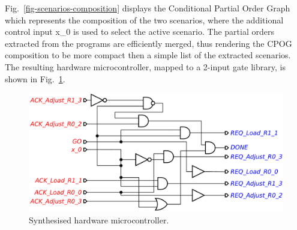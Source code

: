 Fig.~\ref{fig-scenarios-composition} displays the Conditional Partial
Order Graph which represents the composition of the two scenarios, where the
additional control input \textsf{x\_0} is used to select the active scenario.
The partial orders extracted from the programs are efficiently merged, thus
rendering the CPOG composition to be more compact then a simple list of the
extracted scenarios. The resulting hardware microcontroller, mapped to a 2-input
gate library, is shown in Fig.~\ref{fig-scenarios-circuit}.

\begin{figure}[h]
\vspace{-5mm}
\centerline{\includegraphics[scale=0.4]{img/ataed-circuit.pdf}}
\vspace{-3mm}
\caption{Synthesised hardware microcontroller.\label{fig-scenarios-circuit}}
\vspace{-7mm}
\end{figure}

